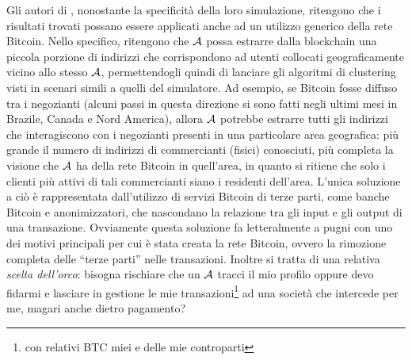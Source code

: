 Gli autori di \cite{user-privacy}, nonostante la specificità della loro simulazione, ritengono che i risultati trovati possano essere applicati anche ad un utilizzo generico della rete Bitcoin.
Nello specifico, ritengono che $\mathcal{A}$ possa estrarre dalla blockchain una piccola porzione di indirizzi che corrispondono ad utenti collocati geograficamente vicino allo stesso $\mathcal{A}$, permettendogli quindi di lanciare gli algoritmi di clustering visti in scenari simili a quelli del simulatore.
Ad esempio, se Bitcoin fosse diffuso tra i negozianti (alcuni passi in questa direzione si sono fatti negli ultimi mesi in Brazile, Canada e Nord America), allora $\mathcal{A}$ potrebbe estrarre tutti gli indirizzi che interagiscono con i negozianti presenti in una particolare area geografica: più grande il numero di indirizzi di commercianti (fisici) conosciuti, più completa la visione che $\mathcal{A}$ ha della rete Bitcoin in quell'area, in quanto si ritiene che solo i clienti più attivi di tali commercianti siano i residenti dell'area.
L'unica soluzione a ciò è rappresentata dall'utilizzo di servizi Bitcoin di terze parti, come banche Bitcoin e anonimizzatori, che nascondano la relazione tra gli input e gli output di una transazione. Ovviamente questa soluzione fa letteralmente a pugni con uno dei motivi principali per cui è stata creata la rete Bitcoin, ovvero la rimozione completa delle ``terze parti'' nelle transazioni. Inoltre si tratta di una relativa \emph{scelta dell'orco}: bisogna rischiare che un $\mathcal{A}$ tracci il mio profilo oppure devo fidarmi e lasciare in gestione le mie transazioni\footnote{con relativi BTC miei e delle mie controparti} ad una società che intercede per me, magari anche dietro pagamento?

